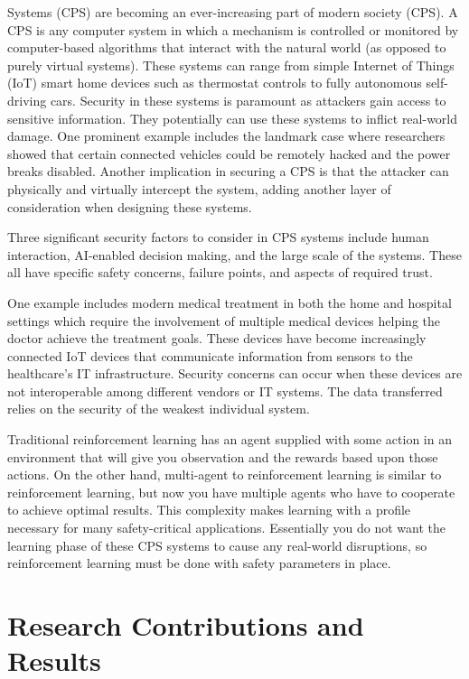\documentclass[journal,onecolumn]{IEEEtran}
\begin{document}
 Systems (CPS) are becoming an ever-increasing part of modern society (CPS). A CPS is any computer system in which a mechanism is controlled or monitored by computer-based algorithms that interact with the natural world (as opposed to purely virtual systems). These systems can range from simple Internet of Things (IoT) smart home devices such as thermostat controls to fully autonomous self-driving cars. Security in these systems is paramount as attackers gain access to sensitive information. They potentially can use these systems to inflict real-world damage. One prominent example includes the landmark case where researchers showed that certain connected vehicles could be remotely hacked and the power breaks disabled. Another implication in securing a CPS is that the attacker can physically and virtually intercept the system, adding another layer of consideration when designing these systems. 

Three significant security factors to consider in CPS systems include human interaction, AI-enabled decision making, and the large scale of the systems. These all have specific safety concerns, failure points, and aspects of required trust. 

One example includes modern medical treatment in both the home and hospital settings which require the involvement of multiple medical devices
helping the doctor achieve the treatment goals. These devices have become increasingly connected IoT devices that communicate information from sensors to the healthcare's IT infrastructure. Security concerns can occur when these devices are not interoperable among different vendors or IT systems. The data transferred relies on the security of the weakest individual system. 

Traditional reinforcement learning has an agent supplied with some action in an environment that will give you observation and the rewards based upon those actions. On the other hand, multi-agent to reinforcement learning is similar to reinforcement learning, but now you have multiple agents who have to cooperate to achieve optimal results. This complexity makes learning with a profile necessary for many safety-critical applications. Essentially you do not want the learning phase of these CPS systems to cause any real-world disruptions, so reinforcement learning must be done with safety parameters in place. 

\section{Research Contributions and Results}
\end{document}
